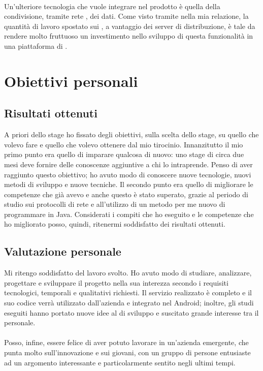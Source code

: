 \paragraph*{}
Un'ulteriore tecnologia che \nomeAzienda{} vuole integrare nel prodotto è quella della condivisione, tramite rete , dei dati. Come visto tramite nella mia relazione, la quantità di lavoro spostato sui , a vantaggio dei server di distribuzione, è tale da rendere molto fruttuoso un investimento nello sviluppo di questa funzionalità in una piattaforma di .

\section{Obiettivi personali}
\subsection{Risultati ottenuti}
A priori dello stage ho fissato degli obiettivi, sulla scelta dello stage, su quello che volevo fare e quello che volevo ottenere dal mio tirocinio. Innanzitutto il mio primo punto era quello di imparare qualcosa di nuovo: uno stage di circa due mesi deve fornire delle conoscenze aggiuntive a chi lo intraprende. Penso di aver raggiunto questo obiettivo; ho avuto modo di conoscere nuove tecnologie, nuovi metodi di sviluppo e nuove tecniche. Il secondo punto era quello di migliorare le competenze che già avevo e anche questo è stato superato, grazie al periodo di studio sui protocolli di rete e all'utilizzo di un metodo per me nuovo di programmare in Java. Considerati i compiti che ho eseguito e le competenze che ho migliorato posso, quindi, ritenermi soddisfatto dei risultati ottenuti.

\subsection{Valutazione personale}
Mi ritengo soddisfatto del lavoro svolto. Ho avuto modo di studiare, analizzare, progettare e sviluppare il progetto nella sua interezza secondo i requisiti tecnologici, temporali e qualitativi richiesti. Il servizio realizzato è completo e il suo codice verrà utilizzato dall'azienda e integrato nel  Android; inoltre, gli studi eseguiti hanno portato nuove idee al  di sviluppo e suscitato grande interesse tra il personale.
\paragraph*{}
Posso, infine, essere felice di aver potuto lavorare in un'azienda emergente, che punta molto sull'innovazione e sui giovani, con un gruppo di persone entusiaste ad un argomento interessante e particolarmente sentito negli ultimi tempi.

